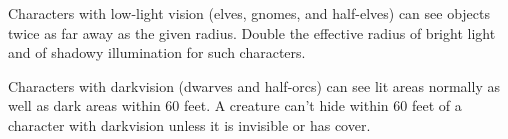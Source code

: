 Characters with low-light vision (elves, gnomes, and half-elves) can see objects twice as far away as the given radius. Double the effective radius of bright light and of shadowy illumination for such characters.

Characters with darkvision (dwarves and half-orcs) can see lit areas normally as well as dark areas within 60 feet. A creature can't hide within 60 feet of a character with darkvision unless it is invisible or has cover.